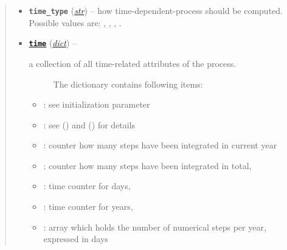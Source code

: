 \documentclass[a4paper,10pt,english]{sphinxmanual}
\begin{document}
\begin{fulllineitems}
\begin{quote}
\begin{description}
\begin{itemize}
\item {} 
\textbf{\texttt{time\_type}} (\href{http://docs.python.org/2.7/library/functions.html\#str}{\emph{str}}) -- how time-dependent-process should be computed. 
Possible values are: , ,
, .

\item {} 
\href{http://docs.python.org/2.7/library/time.html\#module-time}{\textbf{\texttt{time}}} (\href{http://docs.python.org/2.7/library/stdtypes.html\#dict}{\emph{dict}}) -- \begin{description}
\item[{a collection of all time-related attributes of the process. }] \leavevmode
The dictionary contains following items:

\end{description}
\begin{itemize}
\item {} 
: see initialization parameter

\item {} 
: see {\hyperref[api/climlab.process:climlab.process.time_dependent_process.TimeDependentProcess.set_timestep]{\emph{}}} () and {\hyperref[api/climlab.process:climlab.process.time_dependent_process.TimeDependentProcess.timestep]{\emph{}}} () for details

\item {} 
: counter how many steps have been integrated in current year

\item {} 
: counter how many steps have been integrated in total,

\item {} 
: time counter for days,

\item {} 
: time counter for years,

\item {} 
: array which holds the number of numerical steps per year, expressed in days

\end{itemize}



\end{itemize}
\end{description}
\end{quote}
\end{fulllineitems}
\end{document}
